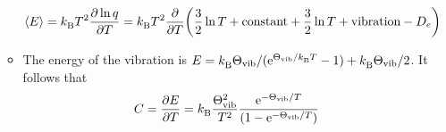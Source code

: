 \documentclass[../notes.tex]{subfiles}
\begin{document}
\begin{itemize}
\begin{itemize}
        \begin{equation*}
            \prb{E} = \kB T^2\pdv{\ln q}{T}
            = \kB T^2\pdv{T}(\frac{3}{2}\ln T+\text{constant}+\frac{3}{2}\ln T+\text{vibration}-D_e)
        \end{equation*}
        \item The energy of the vibration is $E=\kB\Theta_\text{vib}/(\e[\Theta_\text{vib}/\kB T]-1)+\kB\Theta_\text{vib}/2$. It follows that
        \begin{equation*}
            C = \pdv{E}{T}
            = \kB\frac{\Theta_\text{vib}^2}{T^2}\frac{\e[-\Theta_\text{vib}/T]}{(1-\e[-\Theta_\text{vib}/T])}
        \end{equation*}
    \end{itemize}
\end{itemize}
\end{document}
